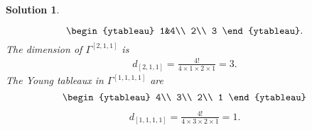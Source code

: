 \documentclass[UTF8,10pt,a4paper]{article}
\theoremstyle{Problem}
\theoremstyle{Solution}
\newtheorem*{sol}{Solution}
\begin{document}
\begin{sol}
\begin{enumerate}
\[\begin{ytableau}
                1&4\\
                2\\
                3
            \end{ytableau}.
        \]
        The dimension of $\Gamma^{[2,1,1]}$ is
        \begin{align}
            d_{[2,1,1]}=\frac{4!}{4\times 1\times 2\times 1}=3.
        \end{align}
        The Young tableaux in $\Gamma^{[1,1,1,1]}$ are
        \[
            \begin{ytableau}
                4\\
                3\\
                2\\
                1
            \end{ytableau}
        \]
        \begin{align}
            d_{[1,1,1,1]}=\frac{4!}{4\times 3\times 2\times 1}=1.
        \end{align}
    \end{enumerate}
\end{sol}
\end{document}
